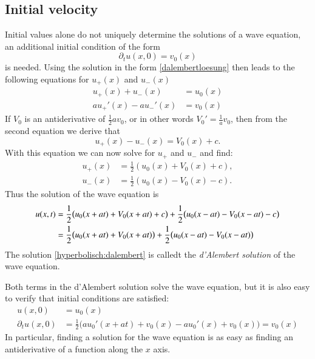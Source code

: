 \subsection{Initial velocity}
Initial values alone do not uniquely determine the solutions of a wave
equation, an additional initial condition of the form
\begin{equation}
\partial_tu(x,0)=v_0(x)\label{welleanfangdt}
\end{equation}
is needed.
Using the solution in the form \eqref{dalembertloesung} then leads
to the following equations for $u_+(x)$ and $u_-(x)$
\begin{align*}
u_+(x)+u_-(x)&=u_0(x)\\
au_+'(x)-au_-'(x)&=v_0(x)
\end{align*}
If $V_0$ is an antiderivative of $\frac12av_0$, or in other
words $V_0'=\frac1av_0$, then from the second equation we derive that
\[
u_+(x)-u_-(x)=V_0(x)+c.
\]
With this equation we can now solve for $u_+$ and $u_-$ and find:
\begin{align*}
u_+(x)&=\frac12(u_0(x)+V_0(x)+c),\\
u_-(x)&=\frac12(u_0(x)-V_0(x)-c).
\end{align*}
Thus the solution of the wave equation is
\begin{align}
u(x,t)
&=
\frac12\bigl(u_0(x+at)+V_0(x+at)+c\bigr)+\frac12\bigl(u_0(x-at)-V_0(x-at)-c\bigr)
\notag
\\
&=
\frac12\bigl(u_0(x+at)+V_0(x+at)\bigr)+\frac12\bigl(u_0(x-at)-V_0(x-at)\bigr)
\label{hyperbolisch:dalembert}
\end{align}
The solution \eqref{hyperbolisch:dalembert} is calledt the
{\em d'Alembert solution} of the wave equation.

Both terms in the d'Alembert solution solve the wave equation, but it
is also easy to verify that initial conditions are satisfied:
\begin{align*}
u(x,0)&=u_0(x)\\
\partial_tu(x,0)&=\frac12\bigl(au_0'(x+at)+v_0(x)-au_0'(x)+v_0(x)\bigr) =v_0(x)
\end{align*}
In particular, finding a solution for the wave equation is as easy as
finding an antiderivative of a function along the $x$ axis.



